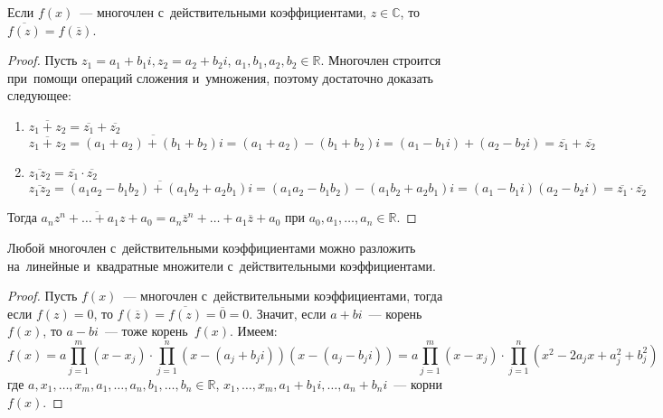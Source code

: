\begin{lemma}
Если $f(x)$~--- многочлен с~действительными коэффициентами, $z \in \mathbb C$, то $\overline{f(z)} = f(\overline z)$.
\end{lemma}
\begin{proof}
Пусть $z_1 = a_1 + b_1 i, z_2 = a_2 + b_2 i$, $a_1, b_1, a_2, b_2 \in \mathbb R$.
Многочлен строится при~помощи операций сложения и~умножения, поэтому достаточно доказать следующее:
\begin{enumerate}
	\item $\overline{z_1 + z_2} = \overline{z_1} + \overline{z_2}$
	\begin{equation*}
	\overline{z_1 + z_2} = \overline{(a_1 + a_2) + (b_1 + b_2)i} = (a_1 + a_2) - (b_1 + b_2)i =
	(a_1 - b_1 i) + (a_2 - b_2 i) = \overline{z_1} + \overline{z_2}
	\end{equation*}
	
	\item $\overline{z_1 z_2} = \overline{z_1} \cdot \overline{z_2}$
	\begin{equation*}
	\overline{z_1 z_2} = \overline{(a_1 a_2 - b_1 b_2) + (a_1 b_2 + a_2 b_1)i} =
	(a_1 a_2 - b_1 b_2) - (a_1 b_2 + a_2 b_1)i = (a_1 - b_1 i)(a_2 - b_2 i) =
	\overline{z_1} \cdot \overline{z_2}
	\end{equation*}
\end{enumerate}
Тогда $\overline{a_n z^n + \ldots + a_1 z + a_0} = a_n \overline z^n + \ldots + a_1 \overline z + a_0$ при $a_0, a_1, \ldots, a_n \in \mathbb R$.
\end{proof}

\begin{theorem}
Любой многочлен с~действительными коэффициентами можно разложить на~линейные и~квадратные множители с~действительными коэффициентами.
\end{theorem}
\begin{proof}
Пусть $f(x)$~--- многочлен с~действительными коэффициентами, тогда если $f(z) = 0$, то $f(\overline z) = \overline{f(z)} = \overline{0} = 0$.
Значит, если $a + bi$~--- корень~$f(x)$, то $a - bi$~--- тоже корень~$f(x)$.
Имеем:
\begin{equation*}
f(x) = a \prod_{j=1}^{m} (x - x_j) \cdot \prod_{j=1}^{n} (x - (a_j + b_j i))(x - (a_j - b_j i)) =
a \prod_{j=1}^{m} (x - x_j) \cdot \prod_{j=1}^{n} (x^2 - 2a_j x + a_j^2 + b_j^2)
\end{equation*}
где $a, x_1, \ldots, x_m, a_1, \ldots, a_n, b_1, \ldots, b_n \in \mathbb R$,\newline
$x_1, \ldots, x_m, a_1 + b_1 i, \ldots, a_n + b_n i$~--- корни~$f(x)$.
\end{proof}

